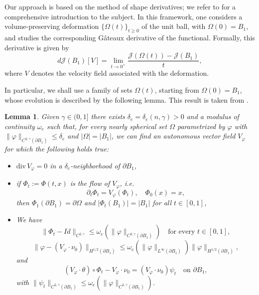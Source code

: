 \documentclass[oneside,a4paper,11pt,notitlepage]{article}
\newcommand{\abs}[1]{{\left|#1\right|}}
\theoremstyle{definition}
\theoremstyle{plain}
\newtheorem{lemma}[theorem]{Lemma}
\theoremstyle{definition}
\begin{document}
Our approach is based on the method of shape derivatives; we refer to \cite{HP} for a comprehensive introduction to the subject. In this framework, one considers a volume-preserving deformation $\{\Omega(t)\}_{t\geq 0}$ of the unit ball, with $\Omega(0)=B_1$, and studies the corresponding Gâteaux derivative of the functional. Formally, this derivative is given by
\begin{equation*}
    d\mathcal{J}(B_1)[V]=\lim_{t\to0^+}\frac{\mathcal{J}(\Omega(t))-\mathcal{J}(B_1)}{t},
\end{equation*}
where $V$ denotes the velocity field associated with the deformation.

In particular, we shall use a family of sets $\Omega(t)$, starting from $\Omega(0)=B_1$, whose evolution is described by the following lemma. This result is taken from \cite[Lemma A.1]{BDPV}.
\begin{lemma}\label{lemmaA.1}
    Given $\gamma\in(0,1]$ there exists $\delta_e=\delta_e(n,\gamma)>0$ and a modulus of continuity $\omega_e$ such that, for every nearly spherical set $\Omega$ parametrized by $\varphi$ with $\|\varphi\|_{C^{2,\gamma}(\partial B_1)}\leq\delta_e$ and $\abs{\Omega}=\abs{B_1}$, we can find an autonomous vector field $V_\varphi$ for which the following holds true:
    \begin{itemize}
        \item [(i)] $\mathrm{div}\,V_\varphi=0$ in a $\delta_e$-neighborhood of $\partial B_1$,
        \item [(ii)] if $\Phi_t:=\Phi(t,x)$ is the flow of $V_\varphi$, i.e.
        \begin{equation*}
            \partial_t \Phi_t=V_\varphi(\Phi_t),\quad \Phi_0(x)=x,
        \end{equation*}
        then $\Phi_1(\partial B_1)=\partial\Omega$ and $\abs{\Phi_t(B_1)}=\abs{B_1}$ for all $t\in[0,1]$,
        \item [(iii)] We have  
        \begin{equation*}
            \|\Phi_t-Id\|_{C^{2,\gamma}}\leq\omega_e(\|\varphi\|_{C^{2,\gamma}(\partial B_1)})\quad \text{for every }t\in[0,1],
        \end{equation*}
        \begin{equation*}
            \|\varphi-(V_\varphi\cdot\nu_0)\|_{H^{1/2}(\partial B_1)}\leq\omega_e(\|\varphi\|_{L^\infty(\partial B_1)})\|\varphi\|_{H^{1/2}(\partial B_1)},
        \end{equation*}
        and
        \begin{equation*}
            (V_\varphi\cdot\theta)\circ\Phi_t-V_\varphi\cdot\nu_0=(V_\varphi\cdot\nu_0)\psi_t \quad \text{on }\partial B_1,
        \end{equation*}
        with $\|\psi_t\|_{C^{2,\gamma}(\partial B_1)}\leq\omega_e(\|\varphi\|_{C^{2,\gamma}(\partial B_1)})$.
    \end{itemize}
\end{lemma}
\end{document}
